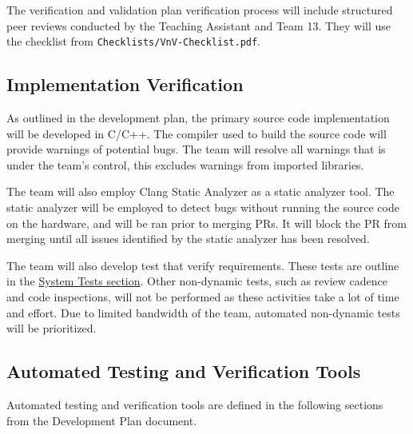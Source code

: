 \documentclass[12pt, titlepage]{article}
\begin{document}
The verification and validation plan verification process will include
structured peer reviews conducted by the Teaching Assistant and Team 13. They
will use the checklist from \texttt{Checklists/VnV-Checklist.pdf}.

\subsection{Implementation Verification}\label{sec:implementation_verification}

As outlined in the development plan, the primary source code implementation will
be developed in C/C++. The compiler used to build the source code will provide
warnings of potential bugs. The team will resolve all warnings that is under the
team's control, this excludes warnings from imported libraries. \newline

The team will also employ Clang Static Analyzer \cite{clangStaticAnalyzer} as a
static analyzer tool. The static analyzer will be employed to detect bugs
without running the source code on the hardware, and will be ran prior to
merging PRs. It will block the PR from merging until all issues identified by
the static analyzer has been resolved.

The team will also develop test that verify requirements. These tests are
outline in the \hyperref[sec:system_tests]{System Tests section}. Other
non-dynamic tests, such as review cadence and code inspections, will not be
performed as these activities take a lot of time and effort. Due to limited
bandwidth of the team, automated non-dynamic tests will be prioritized. 

\subsection{Automated Testing and Verification Tools}
\label{sec:testing_tools}

Automated testing and verification tools are defined in the following sections
from the Development Plan document.
\end{document}
